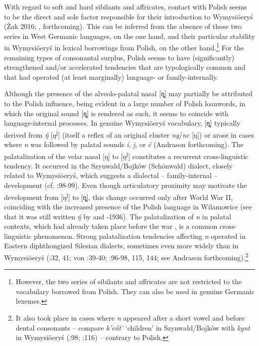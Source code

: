 \documentclass[output=paper]{langscibook}
\begin{document}
With regard to soft and hard sibilants and affricates, contact with Polish seems to be the direct and sole factor responsible for their introduction to Wymysiöeryś (Żak 2016; \citealt{Andrason2014a,20152014a}, forthcoming). This can be inferred from the absence of those two series in West Germanic languages, on the one hand, and their particular stability in Wymysiöeryś in lexical borrowings from Polish, on the other hand.\footnote{However, the two series of sibilants and affricates are not restricted to the vocabulary borrowed from Polish. They can also be used in genuine Germanic lexemes.} For the remaining types of consonantal surplus, Polish seems to have (significantly) strengthened and/or accelerated tendencies that are typologically common and that had operated (at least marginally) language- or family-internally.

Although the presence of the alveolo-palatal nasal [ȵ] may partially be attributed to the Polish influence, being evident in a large number of Polish loanwords, in which the original sound [ȵ] is rendered as such, it seems to coincide with language-internal processes. In genuine Wymysiöeryś vocabulary, [ȵ] typically derived from \textit{\'{ŋ}} [ŋ\textsuperscript{j}] (itself a reflex of an original cluster \textit{ng}/\textit{nc} [ŋ]) or arose in cases where \textit{n} was followed by palatal sounds \textit{i}, \textit{j}, or \textit{ć} (Andrason forthcoming). The palatalization of the velar nasal [ŋ] to [ŋ\textsuperscript{j}] constitutes a recurrent cross-linguistic tendency. It occurred in the Szynwałd/Bojków (Schönwald) dialect, closely related to Wymysiöeryś, which suggests a dialectal – family-internal – development (cf. \citealt{Gusinde1911}:98-99). Even though articulatory proximity may motivate the development from [ŋ\textsuperscript{j}] to [ȵ], this change occurred only after World War II, coinciding with the increased presence of the Polish language in Wilamowice (see that it was still written \textit{\'{ŋ}} by \citealt{Kleczkowski1920} and \citealt{Mojmir1930}-1936). The palatalization of \textit{n} in palatal contexts, which had already taken place before the war \citep{Kleczkowski1920}, is a common cross-linguistic phenomenon. Strong palatalization tendencies affecting \textit{n} operated in Eastern diphthongized Silesian dialects, sometimes even more widely than in Wymysiöeryś (\citealt{Waniek1880}:32, 41; von \citealt{Unwerth1908}:39-40; \citealt{Gusinde1911}:96-98, 115, 144; see Andrason forthcoming).\footnote{It also took place in cases where \textit{n} appeared after a short vowel and before dental consonants – compare \textit{k’eńt’} ‘children’ in Szynwałd/Bojków with \textit{kynt} in Wymysiöeryś (\citealt{Gusinde1911}:98; \citealt{Kleczkowski1920}:116) – contrary to Polish.}
\end{document}
